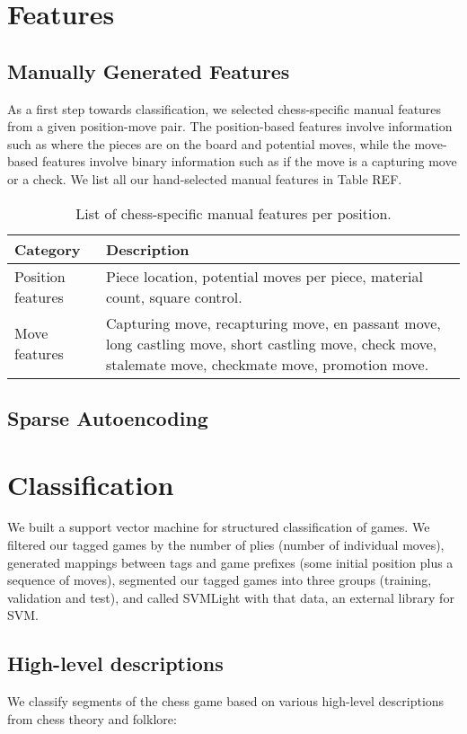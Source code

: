 \documentclass[11pt]{article}
\begin{document}
\section{Features}
\subsection{Manually Generated Features}
As a first step towards classification, we selected chess-specific manual features from a given position-move pair.  The position-based features involve information such as where the pieces are on the board and potential moves, while the move-based features involve binary information such as if the move is a capturing move or a check.  We list all our hand-selected manual features in Table REF.

\begin{table*}
\begin{tabular}{lp{}}
\hline
\textbf{Category} & \textbf{Description} \\ \hline
Position features & Piece location, potential moves per piece, material count, square control. \\
Move features & Capturing move, recapturing move, en passant move, long castling move, short castling move, check move, stalemate move, checkmate move, promotion move.
\end{tabular} 
\caption{List of chess-specific manual features per position.}
\end{table*}

\subsection{Sparse Autoencoding}


\section{Classification}
We built a support vector machine for structured classification of games. We filtered our tagged games by the number of plies (number of individual moves), generated mappings between tags and game prefixes (some initial position plus a sequence of moves), segmented our tagged games into three groups (training, validation and test), and called SVMLight with that data, an external library for SVM.

\subsection{High-level descriptions}
We classify segments of the chess game based on various high-level descriptions from chess theory and folklore:
\end{document}
